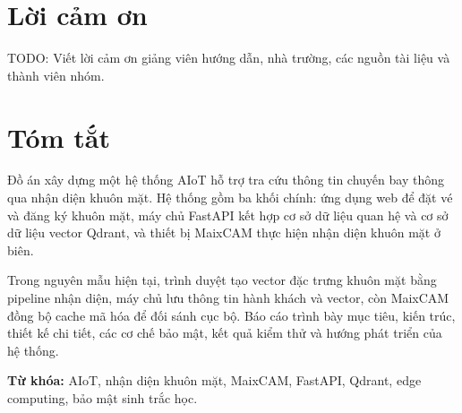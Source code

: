 \newpage
\section*{Lời cảm ơn}
TODO: Viết lời cảm ơn giảng viên hướng dẫn, nhà trường, các nguồn tài liệu và thành viên nhóm.

\newpage
\section*{Tóm tắt}
Đồ án xây dựng một hệ thống AIoT hỗ trợ tra cứu thông tin chuyến bay thông qua nhận diện khuôn mặt. Hệ thống gồm ba khối chính: ứng dụng web để đặt vé và đăng ký khuôn mặt, máy chủ FastAPI kết hợp cơ sở dữ liệu quan hệ và cơ sở dữ liệu vector Qdrant, và thiết bị MaixCAM thực hiện nhận diện khuôn mặt ở biên.

Trong nguyên mẫu hiện tại, trình duyệt tạo vector đặc trưng khuôn mặt bằng pipeline nhận diện, máy chủ lưu thông tin hành khách và vector, còn MaixCAM đồng bộ cache mã hóa để đối sánh cục bộ. Báo cáo trình bày mục tiêu, kiến trúc, thiết kế chi tiết, các cơ chế bảo mật, kết quả kiểm thử và hướng phát triển của hệ thống.

\textbf{Từ khóa:} AIoT, nhận diện khuôn mặt, MaixCAM, FastAPI, Qdrant, edge computing, bảo mật sinh trắc học.

\newpage

